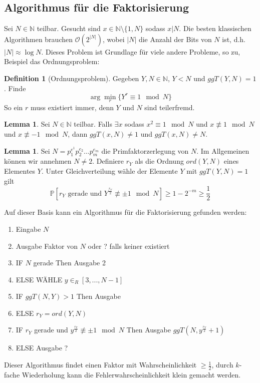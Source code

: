 \documentclass[a4paper, 12pt]{article}
\theoremstyle{plain}
\theoremstyle{definition}
\newtheorem{definition}[theorem]{Definition} %
\theoremstyle{lemma}
\newtheorem{lemma}[theorem]{Lemma}
\theoremstyle{remark}
\theoremstyle{example}
\begin{document}
	\subsection{Algorithmus für die Faktorisierung}
	Sei $N \in \mathbb{N}$ teilbar. Gesucht sind $x \in \mathbb{N}\setminus\{1,N\}$ sodass $x|N$. Die besten klassischen Algorithmen brauchen $\mathcal{O}(2^{\left|N\right|})$, wobei $\left|N\right|$ die Anzahl der Bits von $N$ ist, d.h. $\left|N\right| \approx \log N$. Dieses Problem ist Grundlage für viele andere Probleme, so zu, Beispiel das Ordnungsproblem: \begin{definition}[Ordnungsproblem]
		Gegeben $Y, N \in \mathbb{N}$, $Y<N$ und $ggT(Y,N) = 1$. Finde \[\arg\min_r \{Y^r \equiv 1 \mod N\}\] So ein $r$ muss existiert immer, denn $Y$ und $N$ sind teilerfremd.
	\end{definition}
	\begin{lemma}
		Sei $N\in \mathbb{N}$ teilbar. Falls $\exists x$ sodass $x^2 \equiv 1 \mod N$ und $x \not\equiv 1 \mod N$ und $x \not \equiv -1 \mod N$, dann $ggT(x,N) \neq 1$ und $ggT(x,N) \neq N$.
	\end{lemma}
	\begin{lemma}
		Sei $N = p_1^{e^1}p_2^{e_2}...p_m^{e_m}$ die Primfaktorzerlegung von $N$. Im Allgemeinen können wir annehmen $N\neq 2$. Definiere $r_Y$ als die Ordnung $ord(Y,N)$ eines Elementes $Y$. Unter Gleichverteilung wähle der Elemente $Y$ mit $ggT(Y,N) = 1$ gilt \[\mathbb{P}[r_Y \text{ gerade und } Y^{\frac{r_Y}{2}} \not \equiv \pm 1 \mod N] \geq 1-2^{-m} \geq \frac{1}{2}\]
	\end{lemma}
	Auf dieser Basis kann ein Algorithmus für die Faktorisierung gefunden werden:\\
	\begin{enumerate}
		\item Eingabe $N$
		\item Ausgabe Faktor von $N$ oder ? falls keiner existiert
		\item IF $N$ gerade Then Ausgabe 2
		\item ELSE WÄHLE $y \in _R [3,...,N-1]$
		\item IF $ggT(N,Y) > 1$ Then Ausgabe 
		\item ELSE $r_Y = ord(Y,N)$
		\item IF $r_Y$ gerade und $y^{\frac{r_Y}{2}} \not \equiv \pm 1 \mod N$ Then Ausgabe $ggT(N, y^\frac{r_Y}{2}+1)$
		\item ELSE Ausgabe ?
	\end{enumerate}
	Dieser Algorithmus findet einen Faktor mit Wahrscheinlichkeit $\geq \frac{1}{2}$, durch $k$-fache Wiederholung kann die Fehlerwahrscheinlichkeit klein gemacht werden.
\end{document}
